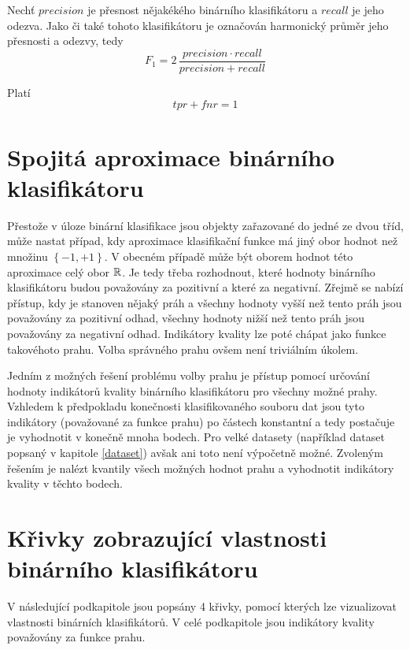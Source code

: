 \begin{define}
	Nechť \( precision \) je přesnost nějakékého binárního klasifikátoru a \( recall \) je jeho odezva. Jako  či také  tohoto klasifikátoru je označován harmonický průměr jeho přesnosti a odezvy, tedy
	\[ F_1 = 2 \, \frac{precision \cdot recall}{precision + recall} \]
\end{define}

\begin{theorem}\label{tpr+fnr}
	Platí
	\[ tpr + fnr = 1 \]
\end{theorem}

\section{Spojitá aproximace binárního klasifikátoru}\label{continuous_aprox}

Přestože v úloze binární klasifikace jsou objekty zařazované do jedné ze dvou tříd, může nastat případ, kdy aproximace klasifikační funkce má jiný obor hodnot než množinu \( \left\{ -1, +1 \right\} \). V obecném případě může být oborem hodnot této aproximace celý obor \( \mathbb R \). Je tedy třeba rozhodnout, které hodnoty binárního klasifikátoru budou považovány za pozitivní a které za negativní. Zřejmě se nabízí přístup, kdy je stanoven nějaký práh a všechny hodnoty vyšší než tento práh jsou považovány za pozitivní odhad, všechny hodnoty nižší než tento práh jsou považovány za negativní odhad. Indikátory kvality lze poté chápat jako funkce takovéhoto prahu. Volba správného prahu ovšem není triviálním úkolem.

Jedním z možných řešení problému volby prahu je přístup pomocí určování hodnoty indikátorů kvality binárního klasifikátoru pro všechny možné prahy. Vzhledem k předpokladu konečnosti klasifikovaného souboru dat jsou tyto indikátory (považované za funkce prahu) po částech konstantní a tedy postačuje je vyhodnotit v konečně mnoha bodech. Pro velké datasety (například dataset popsaný v kapitole \ref{dataset}) avšak ani toto není výpočetně možné. Zvoleným řešením je nalézt kvantily všech možných hodnot prahu a vyhodnotit indikátory kvality v těchto bodech.

\section{Křivky zobrazující vlastnosti binárního klasifikátoru}\label{evaluation_curves}
V následující podkapitole jsou popsány 4 křivky, pomocí kterých lze vizualizovat vlastnosti binárních klasifikátorů. V celé podkapitole jsou indikátory kvality považovány za funkce prahu.

